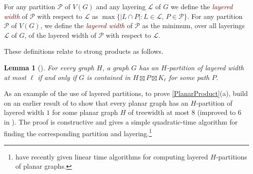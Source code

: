\documentclass{patmorin}
\theoremstyle{plain}
\newtheorem{thm}{Theorem}
\newtheorem{lem}[thm]{Lemma}
\theoremstyle{definition}
\newcommand{\defin}[1]{\textcolor{Maroon}{\emph{#1}}}
\newcommand{\note}[2]{\noindent{\color{red}[#1:~#2]}}
\DeclareMathOperator{\tw}{tw}
\newcommand{\PP}{\mathcal{P}}
\renewcommand{\leq}{\leqslant}
\begin{document}
For any partition $\PP$ of $V(G)$ and any layering $\mathcal{L}$ of $G$ we define the \defin{layered width} of $\PP$ with respect to $\mathcal{L}$ as $\max\{|L\cap P|: L\in\mathcal{L},\, P\in\PP\}$.  For any partition $\PP$ of $V(G)$, we define the \defin{layered width} of $\PP$ as the minimum, over all layerings $\mathcal{L}$ of $G$, of the layered width of $\PP$ with respect to $\mathcal{L}$.


These definitions relate to strong products as follows.

\begin{lem}[\citep{DJMMUW20}]
\label{PartitionProduct}
For every graph $H$, a graph $G$ has an $H$-partition of layered width at most $\ell$ if and only if $G$ is contained in $H \boxtimes P \boxtimes K_\ell$ for some path $P$.
\end{lem}

As an example of the use of layered partitions, to prove \cref{PlanarProduct}(a),
\citet{DJMMUW20} build on an earlier result of \citet{PS21} to show that every planar graph has an $H$-partition of layered width $1$ for some planar graph $H$ of treewidth at most $8$ (improved to $6$ in \cite{UWY}). The proof is constructive and gives a simple quadratic-time algorithm for finding the corresponding partition and layering.\footnote{\citet{bose.morin.ea:optimal} have recently given linear time algorithms for computing layered $H$-partitions of planar graphs.}


%
%
%
\end{document}

